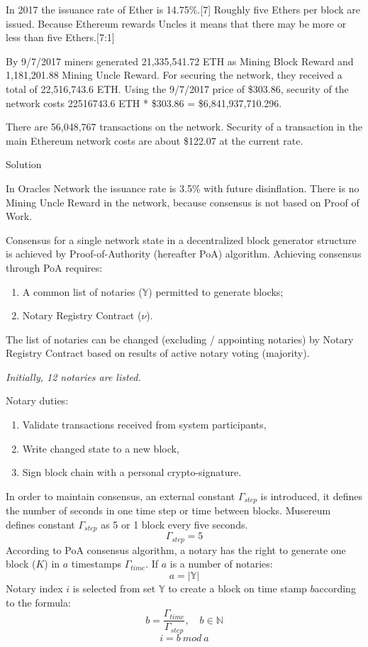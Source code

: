\documentclass[12pt]{report}
\newcommand{\hlc}[1]{\colorbox{white!25}{#1}}
\begin{document}
In 2017 the issuance rate of Ether is 14.75\%.[7] Roughly five Ethers per block are issued. Because Ethereum rewards Uncles it means that there may be more or less than five Ethers.[7:1]

By 9/7/2017 miners generated 21,335,541.72 ETH as Mining Block Reward and 1,181,201.88 Mining Uncle Reward. For securing the network, they received a total of 22,516,743.6 ETH. Using the 9/7/2017 price of \$303.86, security of the network costs 22516743.6 ETH * \$303.86 = \$6,841,937,710.296.

There are 56,048,767 transactions on the network. Security of a transaction in the main Ethereum network costs are about \$122.07 at the current rate.

Solution

In Oracles Network the issuance rate is 3.5\% with future disinflation. There is no Mining Uncle Reward in the network, because consensus is not based on Proof of Work.

Consensus for a single network state in a decentralized block generator structure is achieved by Proof-of-Authority (hereafter PoA) algorithm. Achieving consensus through PoA requires:
\begin{enumerate}
\item A common list of notaries ($\mathbb{Y}$) permitted to generate blocks;
\item Notary Registry Contract ($\nu$).
\end{enumerate}
The list of notaries can be changed (excluding / appointing notaries) by Notary Registry Contract based on results of active notary voting (majority).

\textit{Initially, 12 notaries are listed.}

Notary \hlc{duties}: 
\begin{enumerate}
\item Validate transactions received from system participants,
\item \hlc{Write changed state to a new block},
\item \hlc{Sign block chain} with a personal crypto-signature.
\end{enumerate}

In order to maintain consensus, an external constant $\Gamma_{step}$ is introduced, it defines the number of seconds in one time step or time between blocks. Musereum defines constant $\Gamma_{step}$ as 5 or 1 block every five seconds.
\begin{equation}
\Gamma_{step} = 5
\end{equation}
According to PoA consensus algorithm, a notary has the right to generate one block ($K$) in $a$ \hlc{timestamps} $\Gamma_{time}$. If $a$ is a number of notaries:
\begin{equation}
a = |\mathbb{Y}|
\end{equation}
Notary index $i$ is selected from set $\mathbb{Y}$ to create a block on time stamp $b$according to the formula: 
\begin{equation}
b = \frac{\Gamma_{time}}{\Gamma_{step}},  \quad b \in \mathbb{N} 
\end{equation}
\begin{equation}
i = b \ mod \ a
\end{equation}
\end{document}
